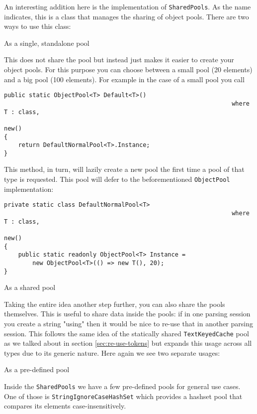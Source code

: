 An interesting addition here is the implementation of \texttt{SharedPools}. As the name indicates, this is a class that manages the sharing of object pools. There are two ways to use this class:

\begin{itemize}
\begin{minipage}{\linewidth}
\item As a single, standalone pool

This does not share the pool but instead just makes it easier to create your object pools. For this purpose you can choose between a small pool (20 elements) and a big pool (100 elements). For example in the case of a small pool you call

\begin{lstlisting}
public static ObjectPool<T> Default<T>() 
																where T : class, 
																					new()
{
	return DefaultNormalPool<T>.Instance;
}
\end{lstlisting}
\end{minipage}

This method, in turn, will lazily create a new pool the first time a pool of that type is requested. This pool will defer to the beforementioned \texttt{ObjectPool} implementation:

\begin{lstlisting}
private static class DefaultNormalPool<T> 
																where T : class, 
																					new()
{
	public static readonly ObjectPool<T> Instance = 
		new ObjectPool<T>(() => new T(), 20);
}
\end{lstlisting}

\item As a shared pool

Taking the entire idea another step further, you can also share the pools themselves. This is useful to share data inside the pools: if in one parsing session you create a string "using" then it would be nice to re-use that in another parsing session. This follows the same idea of the statically shared \texttt{TextKeyedCache} pool as we talked about in section \ref{sec:re-use-tokens} but expands this usage across all types due to its generic nature. Here again we see two separate usages:

\subitem As a pre-defined pool

Inside the \texttt{SharedPools} we have a few pre-defined pools for general use cases. One of those is \texttt{StringIgnoreCaseHashSet} which provides a hashset pool that compares its elements case-insensitively.


\end{itemize}
